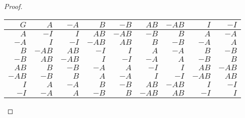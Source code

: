 \documentclass{article}
\begin{document}
\begin{enumerate}
\begin{proof}
      \begin{center}
        \begin{tabular}{|r||r|r|r|r|r|r|r|r|}
          \hline
          $G$       & $A$   & $-A$  & $B$   & $-B$  & $AB$  & $-AB$ & $I$   & $-I$ \\
          \hline\hline
          $A$       & $-I$  & $I$   & $AB$  & $-AB$ & $-B$  & $B$   & $A$   & $-A$ \\
          \hline
          $-A$      & $I$   & $-I$  & $-AB$ & $AB$  & $B$   & $-B$  & $-A$  & $A$ \\
          \hline
          $B$       & $-AB$ & $AB$  & $-I$  & $I$   & $A$   & $-A$  & $B$   & $-B$ \\
          \hline
          $-B$      & $AB$  & $-AB$ & $I$   & $-I$  & $-A$  & $A$   & $-B$  & $B$ \\
          \hline
          $AB$      & $B$   & $-B$  & $-A$  & $A$   & $-I$  & $I$   & $AB$  & $-AB$ \\
          \hline
          $-AB$     & $-B$  & $B$   & $A$   & $-A$  & $I$   & $-I$  & $-AB$ & $AB$ \\
          \hline
          $I$       & $A$   & $-A$  & $B$   & $-B$  & $AB$  & $-AB$ & $I$   & $-I$ \\
          \hline
          $-I$      & $-A$  & $A$   & $-B$  & $B$   & $-AB$ & $AB$  & $-I$  & $I$ \\
          \hline
        \end{tabular}
      \end{center}
    \end{proof}


\end{enumerate}
\end{document}
